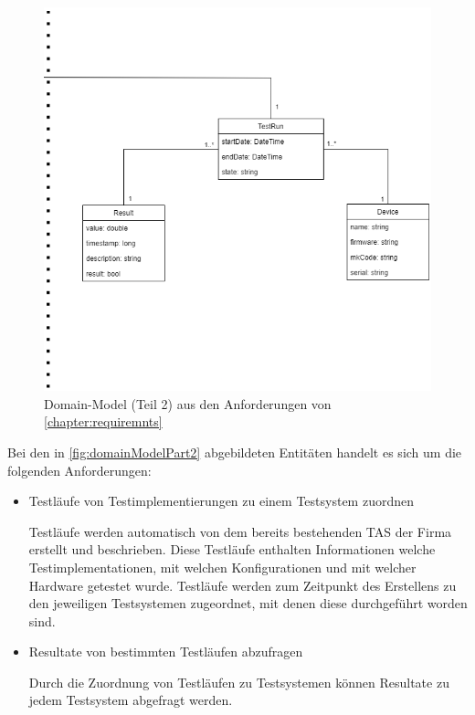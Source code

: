 \documentclass[a4paper, fontsize=11pt, parskip=half, twoside]{scrreprt}
\begin{document}
	\begin{figure}[ht]
		\centering
		\includegraphics[scale=0.6]{assets/TCMS_DomainModel_part2.png}
		\caption{Domain-Model (Teil 2) aus den Anforderungen von \autoref{chapter:requiremnts}}
		\label{fig:domainModelPart2}
	\end{figure}

	Bei den in \autoref{fig:domainModelPart2} abgebildeten Entitäten handelt es sich um die folgenden Anforderungen:
	
	\begin{itemize}
		\item Testläufe von Testimplementierungen zu einem Testsystem zuordnen
		
		Testläufe werden automatisch von dem bereits bestehenden \ac{TAS} der Firma erstellt und beschrieben.
		Diese Testläufe enthalten Informationen welche Testimplementationen, mit welchen Konfigurationen und mit welcher Hardware getestet wurde.
		Testläufe werden zum Zeitpunkt des Erstellens zu den jeweiligen Testsystemen zugeordnet, mit denen diese durchgeführt worden sind.
		
		\item Resultate von bestimmten Testläufen abzufragen
		
		Durch die Zuordnung von Testläufen zu Testsystemen können Resultate zu jedem Testsystem abgefragt werden.
	\end{itemize}
	
\end{document}
